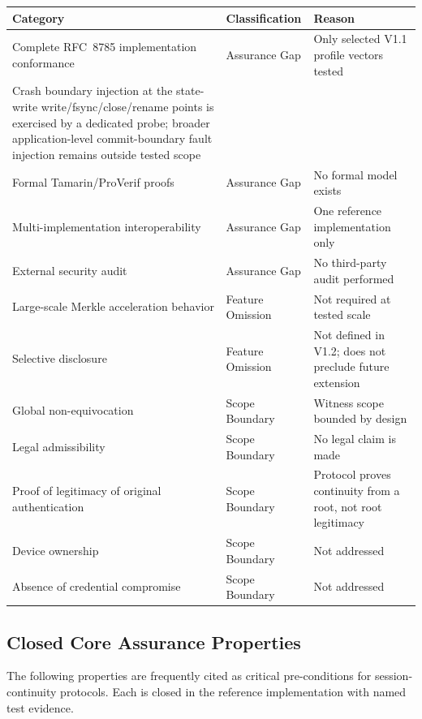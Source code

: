 \documentclass[11pt,a4paper]{article}
\begin{document}
{\small
\begin{longtable}{@{}p{6.5cm}p{3cm}p{5cm}@{}}
\toprule
Category & Classification & Reason \\
\midrule
\endhead
Complete RFC~8785 implementation conformance & Assurance Gap & Only selected V1.1 profile vectors tested \\
Crash boundary injection at the state-write write/fsync/close/rename points is exercised by a dedicated probe; broader application-level commit-boundary fault injection remains outside tested scope \\
Formal Tamarin/ProVerif proofs & Assurance Gap & No formal model exists \\
Multi-implementation interoperability & Assurance Gap & One reference implementation only \\
External security audit & Assurance Gap & No third-party audit performed \\
Large-scale Merkle acceleration behavior & Feature Omission & Not required at tested scale \\
Selective disclosure & Feature Omission & Not defined in V1.2; does not preclude future extension \\
Global non-equivocation & Scope Boundary & Witness scope bounded by design \\
Legal admissibility & Scope Boundary & No legal claim is made \\
Proof of legitimacy of original authentication & Scope Boundary & Protocol proves continuity from a root, not root legitimacy \\
Device ownership & Scope Boundary & Not addressed \\
Absence of credential compromise & Scope Boundary & Not addressed \\
\bottomrule
\end{longtable}
}

\subsection{Closed Core Assurance Properties}

The following properties are frequently cited as critical pre-conditions for session-continuity protocols. Each is closed in the reference implementation with named test evidence.
\end{document}
